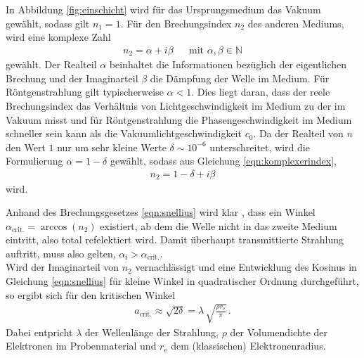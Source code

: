 In Abbildung \ref{fig:einschicht} wird für das Ursprungsmedium das Vakuum gewählt,
sodass gilt $n_{1} = 1$. Für den Brechungsindex $n_{2}$ des anderen Mediums,
wird eine komplexe Zahl
\begin{align}
  n_{2} = \alpha + i \beta& &\text{mit } \alpha, \beta \in \mathbb{N}
  \label{eqn:komplexerindex}
\end{align}
gewählt. Der Realteil $\alpha$ beinhaltet die Informationen bezüglich der
eigentlichen Brechung und der Imaginarteil $\beta$
die Dämpfung der Welle im Medium. Für Röntgenstrahlung gilt typischerweise
$\alpha < 1$. Dies liegt daran, dass der reele Brechungsindex das Verhältnis
von Lichtgeschwindigkeit im Medium zu der im Vakuum misst und für
Röntgenstrahlung die Phasengeschwindigkeit im Medium schneller
sein kann als die Vakuumlichtgeschwindigkeit $c_{0}$.
Da der Realteil von $n$ den Wert $1$ nur um sehr kleine Werte
$\delta \sim 10^{-6}$ unterschreitet, wird die Formulierung
$\alpha = 1 - \delta$ gewählt,
sodass aus Gleichung \eqref{eqn:komplexerindex},
\begin{align}
  n_{2} = 1 - \delta + i \beta
  \label{eqn:komplexerindexdelta}
\end{align}
wird.

Anhand des Brechungsgesetzes \eqref{eqn:snellius} wird klar , dass ein Winkel
$\alpha_\text{{crit.}} = \arccos\left( n_{2} \right)$ existiert,
ab dem die Welle nicht in das zweite Medium eintritt,
also total refelektiert wird.
Damit überhaupt transmittierte Strahlung auftritt, muss also gelten,
$\alpha_{\text{i}} > \alpha_{\text{crit.}}$.\\
Wird der Imaginarteil von $n_{2}$ vernachlässigt und eine Entwicklung
des Kosinus in Gleichung \eqref{eqn:snellius} für kleine Winkel in
quadratischer Ordnung durchgeführt, so ergibt sich für den kritischen Winkel
\begin{align}
  a_{\text{crit.}} \approx \sqrt{2 \delta} = \lambda \,
  \sqrt{\frac{ \rho r_{\text{e}} }{ \pi }} \, .
\end{align}
Dabei entpricht $\lambda$ der Wellenlänge der Strahlung, $\rho$ der
Volumendichte der Elektronen im Probenmaterial und $r_{\text{e}}$ dem
(klassischen) Elektronenradius.

